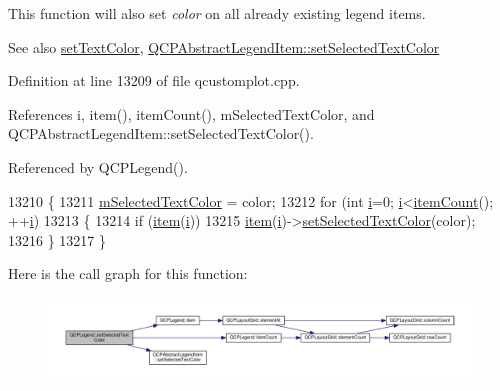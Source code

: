 This function will also set {\itshape color} on all already existing legend items.

\begin{DoxySeeAlso}{See also}
\hyperlink{class_q_c_p_legend_ae1eb239ff4a4632fe1b6c3e668d845c6}{set\+Text\+Color}, \hyperlink{class_q_c_p_abstract_legend_item_a4d01d008ee1a5bfe9905b0397a421936}{Q\+C\+P\+Abstract\+Legend\+Item\+::set\+Selected\+Text\+Color} 
\end{DoxySeeAlso}


Definition at line 13209 of file qcustomplot.\+cpp.



References i, item(), item\+Count(), m\+Selected\+Text\+Color, and Q\+C\+P\+Abstract\+Legend\+Item\+::set\+Selected\+Text\+Color().



Referenced by Q\+C\+P\+Legend().


\begin{DoxyCode}
13210 \{
13211   \hyperlink{class_q_c_p_legend_a6c25c8796c6e73e983aae6024965f2be}{mSelectedTextColor} = color;
13212   \textcolor{keywordflow}{for} (\textcolor{keywordtype}{int} \hyperlink{_comparision_pictures_2_createtest_image_8m_a6f6ccfcf58b31cb6412107d9d5281426}{i}=0; \hyperlink{_comparision_pictures_2_createtest_image_8m_a6f6ccfcf58b31cb6412107d9d5281426}{i}<\hyperlink{class_q_c_p_legend_a198228e9cdc78d3a3c306fa6763d0404}{itemCount}(); ++\hyperlink{_comparision_pictures_2_createtest_image_8m_a6f6ccfcf58b31cb6412107d9d5281426}{i})
13213   \{
13214     \textcolor{keywordflow}{if} (\hyperlink{class_q_c_p_legend_a454272d7094437beb3278a2294006da5}{item}(\hyperlink{_comparision_pictures_2_createtest_image_8m_a6f6ccfcf58b31cb6412107d9d5281426}{i}))
13215       \hyperlink{class_q_c_p_legend_a454272d7094437beb3278a2294006da5}{item}(\hyperlink{_comparision_pictures_2_createtest_image_8m_a6f6ccfcf58b31cb6412107d9d5281426}{i})->\hyperlink{class_q_c_p_abstract_legend_item_a4d01d008ee1a5bfe9905b0397a421936}{setSelectedTextColor}(color);
13216   \}
13217 \}
\end{DoxyCode}


Here is the call graph for this function\+:\nopagebreak
\begin{figure}[H]
\begin{center}
\leavevmode
\includegraphics[width=350pt]{class_q_c_p_legend_a7674dfc7a1f30e1abd1018c0ed45e0bc_cgraph}
\end{center}
\end{figure}




